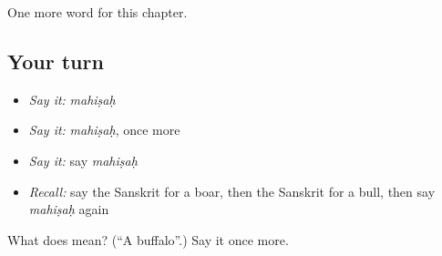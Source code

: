 \begin{grammarlens}[title={What you've built}]
One more word for this chapter.
\end{grammarlens}

\subsection*{Your turn}
\begin{itemize}
\raggedright
  \item \emph{Say it:} \emph{mahiṣaḥ}
  \item \emph{Say it:} \emph{mahiṣaḥ}, once more
  \item \emph{Say it:} say \emph{mahiṣaḥ}
  \item \emph{Recall:} say the Sanskrit for a boar, then the Sanskrit for a bull, then say \emph{mahiṣaḥ} again
\end{itemize}

\begin{tcolorbox}[breakable,colback=teal!4,colframe=teal!35!black,title={Before you move on}]
What does  mean? (\textquotedblleft{}A buffalo\textquotedblright{}.) Say it once more.
\end{tcolorbox}
